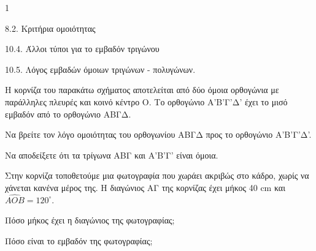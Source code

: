 \begin{ylh}{1}
    \item 8.2. Κριτήρια ομοιότητας
    \item 10.4. Άλλοι τύποι για το εμβαδόν τριγώνου
    \item 10.5. Λόγος εμβαδών όμοιων τριγώνων - πολυγώνων.
\end{ylh}
\begin{figure}
    \centering
\end{figure}
Η κορνίζα του παρακάτω σχήματος αποτελείται από δύο όμοια ορθογώνια με παράλληλες πλευρές και κοινό κέντρο O. Το ορθογώνιο Α'Β'Γ'Δ' έχει το μισό εμβαδόν από το ορθογώνιο ΑΒΓΔ.
\begin{alist}
    \item Να βρείτε τον λόγο ομοιότητας του ορθογωνίου ΑΒΓΔ προς το ορθογώνιο Α'Β'Γ'Δ'. 
    \item Να αποδείξετε ότι τα τρίγωνα ΑΒΓ και Α'Β'Γ' είναι όμοια. 
    \item Στην κορνίζα τοποθετούμε μια φωτογραφία που χωράει ακριβώς στο κάδρο, χωρίς να χάνεται κανένα μέρος της. Η διαγώνιος ΑΓ της κορνίζας έχει μήκος 40 cm και $\widehat{ΑΟΒ} = 120^\circ$.
    \begin{rlist}
        \item Πόσο μήκος έχει η διαγώνιος της φωτογραφίας; 
        \item Πόσο είναι το εμβαδόν της φωτογραφίας; 
    \end{rlist}
\end{alist}